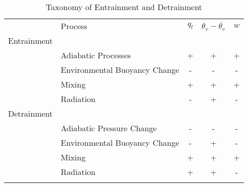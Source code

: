 \documentclass[acp]{copernicus}
\begin{document}









\begin{table*}[t]
\caption{Taxonomy of Entrainment and Detrainment}
\vskip4mm
\centering
\begin{tabular}{llccc}
\tophline
& Process & $q_l$ & $\theta_v - \overline{\theta_v}$ & $w$\\

\middlehline
Entrainment & & & & \\
& Adiabatic Processes & + & + & + \\
& Environmental Buoyancy Change & - & - & - \\
& Mixing & + & + & + \\
& Radiation & - & + & - \\

\middlehline
Detrainment & & & & \\
& Adiabatic Pressure Change & - & - & - \\
& Environmental Buoyancy Change & - & + & - \\
& Mixing & + & + & + \\
& Radiation & + & + & - \\


\bottomhline
\end{tabular}
\end{table*}
\end{document}
